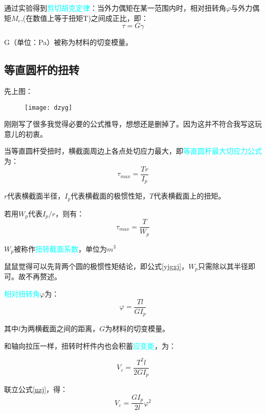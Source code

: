 \documentclass[10pt,a4paper]{ctexart}
\begin{document}
通过实验得到\textcolor{cyan}{剪切胡克定律}：当外力偶矩在某一范围内时，相对扭转角$\varphi$与外力偶矩$M_e$,(在数值上等于扭矩T)之间成正比，即：
\begin{equation}
	\tau=G\gamma
	\label{jq}
\end{equation}

G（单位：Pa）被称为材料的切变模量。

\subsection{等直圆杆的扭转}
先上图：
\begin{figure}[htp]%
	\centering
	\texttt{[image: dzyg]}
\end{figure}

刚刚写了很多我觉得必要的公式推导，想想还是删掉了。因为这并不符合我写这玩意儿的初衷。

当等直圆杆受扭时，横截面周边上各点处切应力最大，即\textcolor{cyan}{等直圆杆最大切应力公式}为：
\begin{equation}
	\tau_{max}=\frac{Tr}{I_p}
\end{equation}

$r$代表横截面半径，$I_p$代表横截面的极惯性矩，$T$代表横截面上的扭矩。

若用$W_p$代表$I_p/r$，则有：
\begin{equation}
\tau_{max}=\frac{T}{W_p}
\end{equation}

$W_p$被称作\textcolor{cyan}{扭转截面系数}，单位为$m^3$

鼠鼠觉得可以先背两个圆的极惯性矩结论，即公式\ref{yjgxj}，$W_p$只需除以其半径即可。故不再赘述。

\textcolor{cyan}{相对扭转角}$\varphi$为：
\begin{equation}
	\varphi=\frac{Tl}{GI_p}
	\label{nzj}
\end{equation}

其中$l$为两横截面之间的距离，$G$为材料的切变模量。

和轴向拉压一样，扭转时杆件内也会积蓄\textcolor{cyan}{应变能}，为：

\begin{equation}
	V_\varepsilon=\frac{T^2l}{2GI_p}
\end{equation}

联立公式\ref{nzj}，得：
\begin{equation}
	V_\varepsilon=\frac{GI_p}{2l}\varphi^2
\end{equation}
\end{document}
